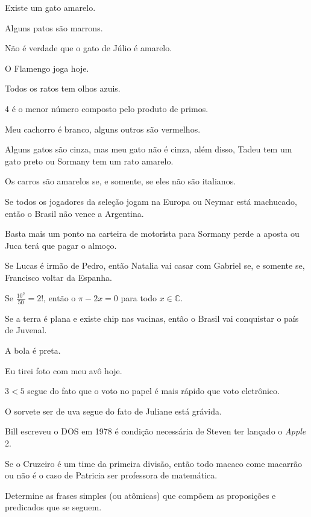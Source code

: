 \begin{exerList}
	\item Existe um gato amarelo.
	\item Alguns patos são marrons.
	\item Não é verdade que o gato de Júlio é amarelo.
	\item O Flamengo joga hoje.
	\item Todos os ratos tem olhos azuis.
	\item 4 é o menor número composto pelo produto de primos.
	\item Meu cachorro é branco, alguns outros são vermelhos.
	\item Alguns gatos são cinza, mas meu gato não é cinza, além disso, Tadeu tem um gato preto ou Sormany tem um rato amarelo.
	\item Os carros são amarelos se, e somente, se eles não são italianos.
	\item Se todos os jogadores da seleção jogam na Europa ou Neymar está machucado, então o Brasil não vence a Argentina.
	\item Basta mais um ponto na carteira de motorista para Sormany perde a aposta ou Juca terá que pagar o almoço.
	\item Se Lucas é irmão de Pedro, então Natalia vai casar com Gabriel se, e somente se, Francisco voltar da Espanha.
	\item Se $\frac{10^2}{50} = 2!$, então o $\pi - 2x = 0$ para todo $x \in \mathbb{C}$.
	\item Se a terra é plana e existe chip nas vacinas, então o Brasil vai conquistar o país de Juvenal. 
	\item A bola é preta.
	\item Eu tirei foto com meu avô hoje.
	\item $3 < 5$ segue do fato que o  voto no papel é mais rápido que voto eletrônico.
	\item O sorvete ser de uva segue do fato de Juliane está grávida.
	\item Bill escreveu o DOS em 1978 é condição necessária de Steven ter lançado o \textit{Apple} 2.
	\item Se o Cruzeiro é um time da primeira divisão, então todo macaco come macarrão ou não é o caso de Patricia ser professora de matemática. 
\end{exerList}

\begin{problem}\label{prob:IntroLogica2}
	Determine as frases simples (ou atômicas) que compõem as proposições e predicados que se seguem.
\end{problem}

